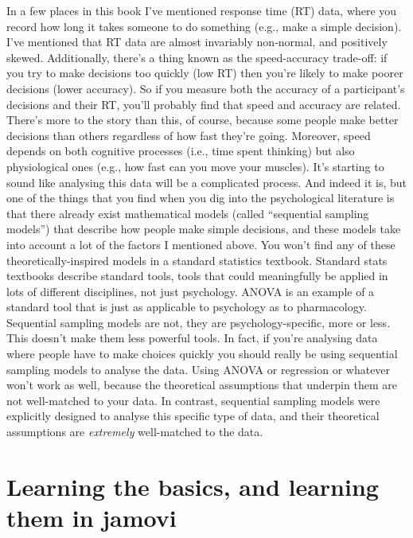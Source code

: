 \begin{itemize}
 In a few places in this book I've mentioned response time (RT) data, where you record how long it takes someone to do something (e.g., make a simple decision). I've mentioned that RT data are almost invariably non-normal, and positively skewed. Additionally, there's a thing known as the speed-accuracy trade-off: if you try to make decisions too quickly (low RT) then you're likely to make poorer decisions (lower accuracy). So if you measure both the accuracy of a participant's decisions and their RT, you'll probably find that speed and accuracy are related. There's more to the story than this, of course, because some people make better decisions than others regardless of how fast they're going. Moreover, speed depends on both cognitive processes (i.e., time spent thinking) but also physiological ones (e.g., how fast can you move your muscles). It's starting to sound like analysing this data will be a complicated process. And indeed it is, but one of the things that you find when you dig into the psychological literature is that there already exist mathematical models (called ``sequential sampling models'') that describe how people make simple decisions, and these models take into account a lot of the factors I mentioned above. You won't find any of these theoretically-inspired models in a standard statistics textbook. Standard stats textbooks describe standard tools, tools that could meaningfully be applied in lots of different disciplines, not just psychology. ANOVA is an example of a standard tool that is just as applicable to psychology as to pharmacology. Sequential sampling models are not, they are psychology-specific, more or less. This doesn't make them less powerful tools. In fact, if you're analysing data where people have to make choices quickly you should really be using sequential sampling models to analyse the data. Using ANOVA or regression or whatever won't work as well, because the theoretical assumptions that underpin them are not well-matched to your data. In contrast, sequential sampling models were explicitly designed to analyse this specific type of data, and their theoretical assumptions are {\it extremely} well-matched to the data. 
\end{itemize}

\section{Learning the basics, and learning them in jamovi}

